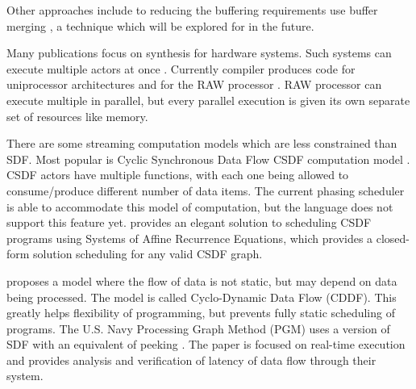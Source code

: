 Other approaches include to reducing the buffering requirements
use buffer merging \cite{murthy99buffer}, a technique which will
be explored for {\StreamIt} in the future.

Many publications focus on synthesis for hardware systems.  Such
systems can execute multiple actors at once
\cite{govindarajan-minimizing}.  Currently {\StreamIt} compiler
produces code for uniprocessor architectures \cite{streamittech2}
and for the RAW processor \cite{gordo-thesis}.  RAW processor can
execute multiple {\filters} in parallel, but every parallel
execution is given its own separate set of resources like memory.

There are some streaming computation models which are less
constrained than SDF. Most popular is Cyclic Synchronous Data Flow
CSDF computation model \cite{parks95comparison}.  CSDF actors have
multiple {\work} functions, with each one being allowed to
consume/produce different number of data items. The current
{\StreamIt} phasing scheduler is able to accommodate this model of
computation, but the {\StreamIt} language does not support this
feature yet. \cite{streamittech3} provides an elegant solution to
scheduling CSDF programs using Systems of Affine Recurrence
Equations, which provides a closed-form solution scheduling for
any valid CSDF graph.

\cite{wauters96cyclodynamic} proposes a model where the flow of
data is not static, but may depend on data being processed. The
model is called Cyclo-Dynamic Data Flow (CDDF). This greatly helps
flexibility of programming, but prevents fully static scheduling
of programs. The U.S. Navy Processing Graph Method (PGM) uses a
version of SDF with an equivalent of peeking \cite{goddard00navy}.
The paper is focused on real-time execution and provides analysis
and verification of latency of data flow through their system.
